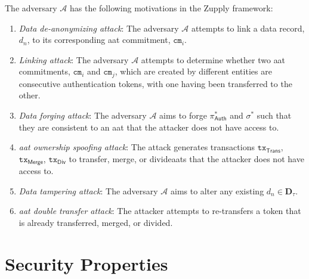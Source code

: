 \begin{definition}
        \label{def:Adversary Goals}
            The adversary $\mathcal{A}$ has the following motivations in the Zupply framework:

        \begin{enumerate}        

            \item \textit{Data de-anonymizing attack}: The adversary $\mathcal{A}$ attempts to link a data record, $d_n$, to its corresponding \gls{aat} commitment, $\texttt{cm}_i$.

           
            
            \item \textit{Linking attack}: The adversary $\mathcal{A}$ attempts to determine whether two \gls{aat} commitments, $\texttt{cm}_i$ and $\texttt{cm}_j$, which are created by different entities are consecutive authentication tokens, with one having been transferred to the other.
            
            \item \textit{Data forging attack}:
            The adversary $\mathcal{A}$ aims to forge $\pi_\mathsf{Auth}^\ast$ and $\sigma^\ast$ such that they are consistent to an \gls{aat} that the attacker does not have access to. 


            \item \textit{\gls{aat} ownership spoofing attack}:
            The attack generates transactions $\texttt{tx}_\mathsf{Trans}$, $\texttt{tx}_\mathsf{Merge}$, $\texttt{tx}_\mathsf{Div}$ to  transfer, merge, or divide\gls{aat}s that the attacker does not have access to.

            
            \item \textit{Data tampering attack}:
            The adversary $\mathcal{A}$ aims to alter any existing $d_{n} \in \mathbf{D}_\tau$.

            \item \textit{\gls{aat} double transfer attack}:
            The attacker attempts to re-transfers a token that is already transferred, merged, or divided.
    \end{enumerate}

\end{definition}


\section{Security Properties}
\label{sec:Security Properties}

